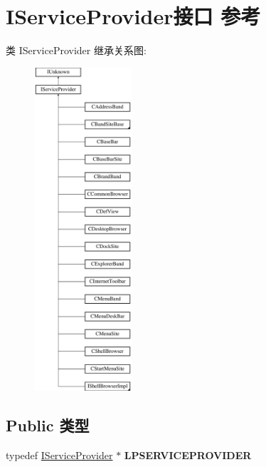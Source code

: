\hypertarget{interface_i_service_provider}{}\section{I\+Service\+Provider接口 参考}
\label{interface_i_service_provider}
类 I\+Service\+Provider 继承关系图\+:\begin{figure}[H]
\begin{center}
\leavevmode
\includegraphics[height=12.000000cm]{interface_i_service_provider}
\end{center}
\end{figure}
\subsection*{Public 类型}
\begin{DoxyCompactItemize}
\item 
\mbox{\label{interface_i_service_provider_aeed4b7b9e00880abfcd384b5752764ea}} 
typedef \hyperlink{interface_i_service_provider}{I\+Service\+Provider} $\ast$ {\bfseries L\+P\+S\+E\+R\+V\+I\+C\+E\+P\+R\+O\+V\+I\+D\+ER}
\end{DoxyCompactItemize}
